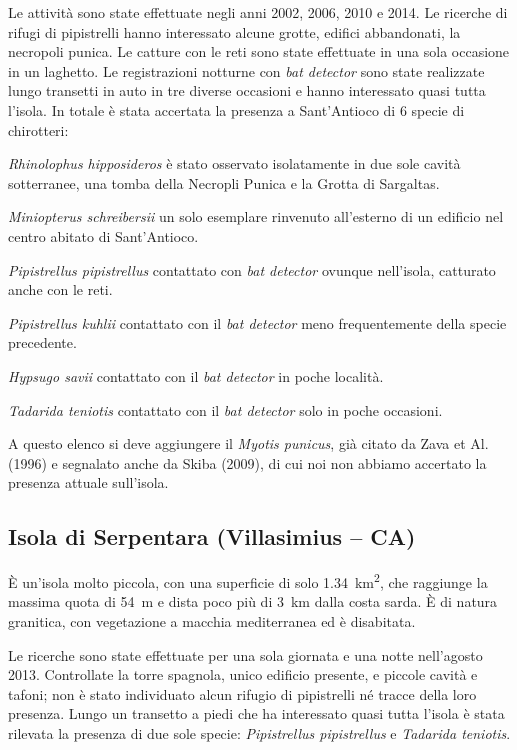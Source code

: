 \begin{multicols}{2}
\begin{compactdesc}
Le attività sono state effettuate negli anni 2002, 2006, 2010 e 2014. Le ricerche di rifugi di pipistrelli hanno interessato alcune grotte, edifici abbandonati, la necropoli punica. Le catture con le reti sono state effettuate in una sola occasione in un laghetto. Le registrazioni notturne con \textit{bat detector} sono state realizzate lungo transetti in auto in tre diverse occasioni e hanno interessato quasi tutta l’isola.
In totale è stata accertata la presenza a Sant’Antioco di 6 specie di chirotteri: 
\begin{compactdesc}
\item[\emph{Rhinolophus hipposideros}] è stato osservato isolatamente in due sole cavità sotterranee, una tomba della Necropli Punica e la Grotta di Sargaltas. 
\item[\emph{Miniopterus schreibersii}] un solo esemplare rinvenuto all’esterno di un edificio nel centro abitato di Sant’Antioco.
\item[\emph{Pipistrellus pipistrellus}] contattato con \textit{bat detector} ovunque nell’isola, catturato anche con le reti. 
\item[\emph{Pipistrellus kuhlii}] contattato con il \textit{bat detector} meno frequentemente della specie precedente. 
\item[\emph{Hypsugo savii}] contattato con il \textit{bat detector} in poche località. 
\item[\emph{Tadarida teniotis}] contattato con il \textit{bat detector} solo in poche occasioni. 
\end{compactdesc}
A questo elenco si deve aggiungere il \emph{Myotis punicus}, già citato da Zava et Al. (1996) e segnalato anche da Skiba (2009), di cui noi non abbiamo accertato la presenza attuale sull’isola.

\subsection*{Isola di Serpentara (Villasimius – CA)}
È un’isola molto piccola, con una superficie di solo \SI{1.34}{\square\kilo\meter}, che raggiunge la massima quota di 54~m e dista poco più di 3~km dalla costa sarda. È di natura granitica, con vegetazione a macchia mediterranea ed è disabitata. 

Le ricerche sono state effettuate per una sola giornata e una notte nell’agosto 2013. Controllate la torre spagnola, unico edificio presente, e piccole cavità e tafoni; non è stato individuato alcun rifugio di pipistrelli né tracce della loro presenza.
Lungo un transetto a piedi che ha interessato quasi tutta l’isola è stata rilevata la presenza di due sole specie: \emph{Pipistrellus pipistrellus} e \emph{Tadarida teniotis}.


\end{compactdesc}
\end{multicols}
